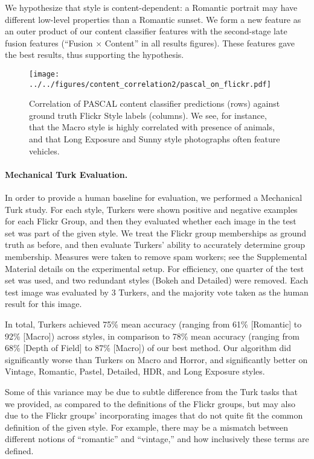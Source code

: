 We hypothesize that style is content-dependent: a Romantic portrait may have different low-level properties than a Romantic sunset. We form a new feature as an outer product of our content classifier features with the second-stage late fusion features (``Fusion $\times$ Content'' in all results figures).  These features gave the best results, thus supporting the hypothesis.

\begin{figure}[h]
\centering
    \texttt{[image: ../../figures/content\_correlation2/pascal\_on\_flickr.pdf]}
    \caption{
        Correlation of PASCAL content classifier predictions (rows) against ground truth Flickr Style labels (columns).
        We see, for instance, that the Macro style is highly correlated with presence of animals, and that Long Exposure and Sunny style photographs often feature vehicles.
    }\label{fig:content_correlation}
\end{figure}

\vspace{-.5em}
\paragraph{Mechanical Turk Evaluation.}\label{sec:mech_turk_evaluation}
In order to provide a human baseline for evaluation, we performed a Mechanical Turk study.
For each style, Turkers were shown positive and negative examples for each Flickr Group, and then they evaluated whether each image in the test set was part of the given style.
We treat the Flickr group memberships as ground truth as before, and then evaluate Turkers' ability to accurately determine group membership.
Measures were taken to remove spam workers; see the Supplemental Material details on the experimental setup.
For efficiency, one quarter of the test set was used, and two redundant styles (Bokeh and Detailed) were removed.
Each test image was evaluated by 3 Turkers, and the majority vote taken as the human result for this image.

In total, Turkers achieved 75\% mean accuracy (ranging from 61\% [Romantic] to 92\% [Macro]) across styles, in comparison to 78\% mean accuracy (ranging from 68\% [Depth of Field] to 87\% [Macro]) of our best method.
Our algorithm did significantly worse than Turkers on Macro and Horror, and significantly better on Vintage, Romantic, Pastel, Detailed, HDR, and Long Exposure styles.

Some of this variance may be due to subtle difference from the Turk tasks that we provided, as compared to the definitions of the Flickr groups, but may also due to the Flickr groups' incorporating images that do not quite fit the common definition of the given style.
For example, there may be a mismatch between different notions of ``romantic'' and ``vintage,'' and how inclusively these terms are defined.

